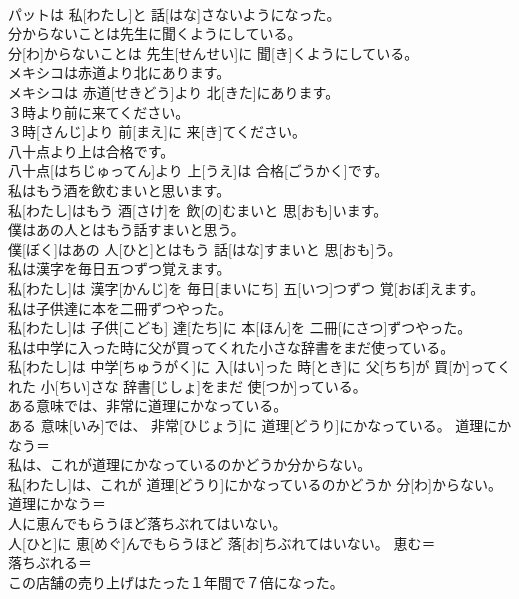 \documentclass[8pt]{extreport}
\begin{document}
\begin{CJK}{UTF8}{min}
\\	パットは 私[わたし]と 話[はな]さないようになった。	
\\	分からないことは先生に聞くようにしている。	
\\	分[わ]からないことは 先生[せんせい]に 聞[き]くようにしている。	
\\	メキシコは赤道より北にあります。	
\\	メキシコは 赤道[せきどう]より 北[きた]にあります。	
\\	３時より前に来てください。	
\\	３時[さんじ]より 前[まえ]に 来[き]てください。	
\\	八十点より上は合格です。	
\\	八十点[はちじゅってん]より 上[うえ]は 合格[ごうかく]です。	
\\	私はもう酒を飲むまいと思います。	
\\	私[わたし]はもう 酒[さけ]を 飲[の]むまいと 思[おも]います。	
\\	僕はあの人とはもう話すまいと思う。	
\\	僕[ぼく]はあの 人[ひと]とはもう 話[はな]すまいと 思[おも]う。	
\\	私は漢字を毎日五つずつ覚えます。	
\\	私[わたし]は 漢字[かんじ]を 毎日[まいにち] 五[いつ]つずつ 覚[おぼ]えます。	
\\	私は子供達に本を二冊ずつやった。	
\\	私[わたし]は 子供[こども] 達[たち]に 本[ほん]を 二冊[にさつ]ずつやった。	
\\	私は中学に入った時に父が買ってくれた小さな辞書をまだ使っている。	
\\	私[わたし]は 中学[ちゅうがく]に 入[はい]った 時[とき]に 父[ちち]が 買[か]ってくれた 小[ちい]さな 辞書[じしょ]をまだ 使[つか]っている。	
\\	ある意味では、非常に道理にかなっている。	
\\	ある 意味[いみ]では、 非常[ひじょう]に 道理[どうり]にかなっている。	道理にかなう＝ 
\\	私は、これが道理にかなっているのかどうか分からない。	
\\	私[わたし]は、これが 道理[どうり]にかなっているのかどうか 分[わ]からない。	道理にかなう＝ 
\\	人に恵んでもらうほど落ちぶれてはいない。	
\\	人[ひと]に 恵[めぐ]んでもらうほど 落[お]ちぶれてはいない。	恵む＝ 
\\	落ちぶれる＝ 
\\	この店舗の売り上げはたった１年間で７倍になった。	

\end{CJK}
\end{document}

